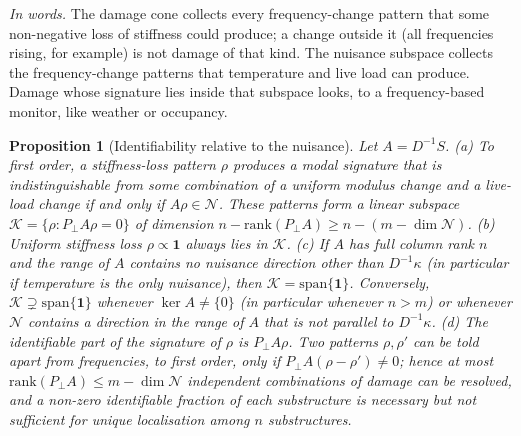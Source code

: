 \documentclass[12pt,a4paper]{article}
\newcommand{\rev}[1]{#1}
\newenvironment{revblock}{}{}
\newcommand{\rev}[1]{{\color{revcol}#1}}
\newenvironment{revblock}{\begingroup\color{revcol}}{\endgroup}
\newtheorem{proposition}{Proposition}
\begin{document}
\begin{revblock}
\noindent\emph{In words.} The damage cone collects every frequency-change pattern that some non-negative loss of stiffness could produce; a change outside it (all frequencies rising, for example) is not damage of that kind. The nuisance subspace collects the frequency-change patterns that temperature and live load can produce. Damage whose signature lies inside that subspace looks, to a frequency-based monitor, like weather or occupancy.
\end{revblock}

\begin{proposition}[Identifiability relative to the nuisance]\label{prop:ident}
Let $A=D^{-1}S$. \rev{(a)} To first order, a stiffness-loss pattern $\rho$ produces a modal signature that is indistinguishable from some combination of a uniform modulus change and a live-load change if and only if $A\rho\in\mathcal{N}$. \rev{These patterns form a linear subspace $\mathcal{K}=\{\rho:P_\perp A\rho=0\}$ of dimension $n-\mathrm{rank}(P_\perp A)\ge n-(m-\dim\mathcal{N})$.}
\rev{(b)} Uniform stiffness loss $\rho\propto\mathbf{1}$ always lies in $\mathcal{K}$.
\rev{(c) If $A$ has full column rank $n$ and the range of $A$ contains no nuisance direction other than $D^{-1}\kappa$ (in particular if temperature is the only nuisance), then $\mathcal{K}=\mathrm{span}\{\mathbf{1}\}$. Conversely, $\mathcal{K}\supsetneq\mathrm{span}\{\mathbf{1}\}$ whenever $\ker A\ne\{0\}$ (in particular whenever $n>m$) or whenever $\mathcal{N}$ contains a direction in the range of $A$ that is not parallel to $D^{-1}\kappa$.}
\rev{(d)} The identifiable part of the signature of $\rho$ is $P_\perp A\rho$. \rev{Two patterns $\rho,\rho'$ can be told apart from frequencies, to first order, only if $P_\perp A(\rho-\rho')\neq0$; hence at most $\mathrm{rank}(P_\perp A)\le m-\dim\mathcal{N}$ independent combinations of damage can be resolved, and a non-zero identifiable fraction of each substructure is necessary but not sufficient for unique localisation among $n$ substructures.}
\end{proposition}
\end{document}
